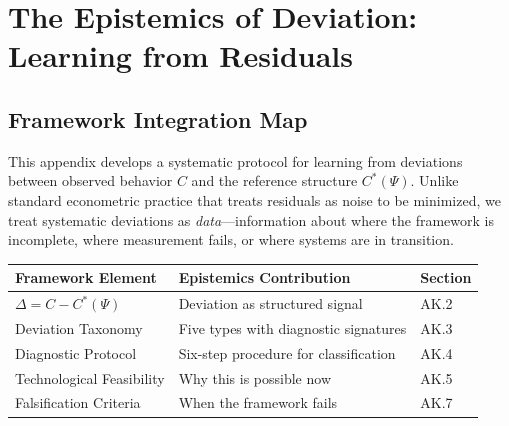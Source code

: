 \section{The Epistemics of Deviation: Learning from Residuals}
\label{app:epistemics}

\subsection{Framework Integration Map}

This appendix develops a systematic protocol for learning from deviations 
between observed behavior $C$ and the reference structure $C^*(\Psi)$. 
Unlike standard econometric practice that treats residuals as noise to be 
minimized, we treat systematic deviations as \textit{data}---information 
about where the framework is incomplete, where measurement fails, or where 
systems are in transition.

\begin{center}
\renewcommand{\arraystretch}{1.4}
\begin{tabular}{|l|l|l|}
\hline
\textbf{Framework Element} & \textbf{Epistemics Contribution} & \textbf{Section} \\
\hline
$\Delta = C - C^*(\Psi)$ & Deviation as structured signal & AK.2 \\
Deviation Taxonomy & Five types with diagnostic signatures & AK.3 \\
Diagnostic Protocol & Six-step procedure for classification & AK.4 \\
Technological Feasibility & Why this is possible now & AK.5 \\
Falsification Criteria & When the framework fails & AK.7 \\
\hline
\end{tabular}
\end{center}

